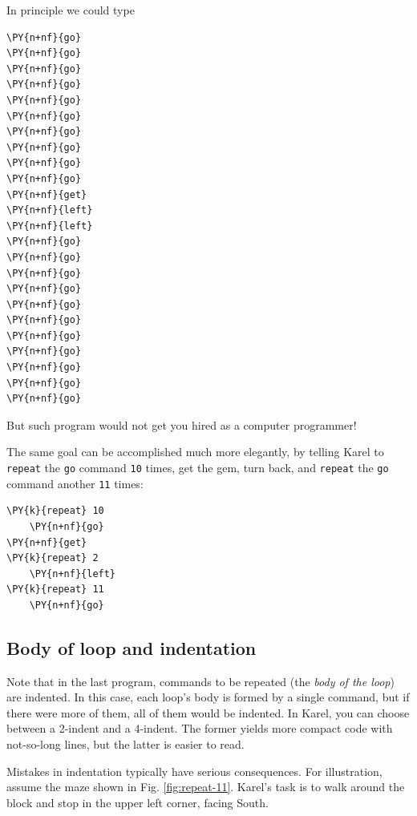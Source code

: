 \noindent
In principle we could type\\

\begin{bbox}
\begin{Verbatim}[commandchars=\\\{\}]
\PY{n+nf}{go}
\PY{n+nf}{go}
\PY{n+nf}{go}
\PY{n+nf}{go}
\PY{n+nf}{go}
\PY{n+nf}{go}
\PY{n+nf}{go}
\PY{n+nf}{go}
\PY{n+nf}{go}
\PY{n+nf}{go}
\PY{n+nf}{get}
\PY{n+nf}{left}
\PY{n+nf}{left}
\PY{n+nf}{go}
\PY{n+nf}{go}
\PY{n+nf}{go}
\PY{n+nf}{go}
\PY{n+nf}{go}
\PY{n+nf}{go}
\PY{n+nf}{go}
\PY{n+nf}{go}
\PY{n+nf}{go}
\PY{n+nf}{go}
\PY{n+nf}{go}
\end{Verbatim}
\end{bbox}
\vspace{6mm}

\noindent
But such program would not get you hired as a computer programmer! 

\noindent
The same goal can be accomplished much more elegantly, by telling Karel to {\tt repeat} the {\tt go} 
command {\tt 10} times, get the gem, turn back, and  {\tt repeat} the {\tt go} 
command another {\tt 11} times:\\

\begin{bbox}
\begin{Verbatim}[commandchars=\\\{\}]
\PY{k}{repeat} 10
    \PY{n+nf}{go}
\PY{n+nf}{get}
\PY{k}{repeat} 2
    \PY{n+nf}{left}
\PY{k}{repeat} 11
    \PY{n+nf}{go}
\end{Verbatim}
\end{bbox}

\subsection{Body of loop and indentation}

Note that in the last program, commands to be repeated (the {\em body of the loop}) 
are indented. In this case, each loop's body is formed by a single command, but if
there were more of them, all of them would be indented. In Karel, you can choose between 
a 2-indent and a 4-indent. The former yields more compact code with not-so-long lines, 
but the latter is easier to read. 

Mistakes in indentation typically have serious consequences. 
For illustration, assume the maze shown in Fig. \ref{fig:repeat-11}.
Karel's task is to walk around the block and stop in the 
upper left corner, facing South. 

